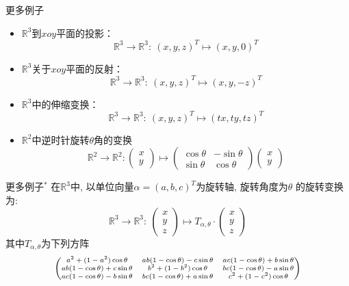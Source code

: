 
\begin{frame}

\begin{block}{更多例子}
\begin{itemize}
\item<1-> $\mathbb{R}^3$到$xoy$平面的投影：
\[\mathbb{R}^3 \to \mathbb{R}^3: \ (x,y,z)^T \mapsto (x,y,0)^T\]
\item<2-> $\mathbb{R}^3$关于$xoy$平面的反射：
\[\mathbb{R}^3 \to \mathbb{R}^3: \ (x,y,z)^T \mapsto (x,y,-z)^T\]
\item<3-> $\mathbb{R}^3$中的伸缩变换：
\[\mathbb{R}^3 \to \mathbb{R}^3: \ (x,y,z)^T \mapsto (tx,ty,tz)^T\]
\item<4-> $\mathbb{R}^2$中逆时针旋转$\theta$角的变换
\[
\mathbb{R}^2 \to \mathbb{R}^2: \begin{pmatrix} x \\ y \end{pmatrix} \mapsto \begin{pmatrix} \cos\theta & -\sin\theta \\ \sin\theta & \cos\theta \end{pmatrix} \begin{pmatrix} x \\ y \end{pmatrix}
\]
\end{itemize}
\end{block}

\end{frame}


\begin{frame}

\begin{block}{更多例子$^*$}
在$\mathbb{R}^3$中, 以单位向量$\alpha = (a,b,c)^T$为旋转轴, 旋转角度为$\theta$ 的旋转变换为:
\[
\mathbb{R}^3 \to \mathbb{R}^3: \ \begin{pmatrix} x \\ y \\ z \end{pmatrix} \mapsto T_{\alpha, \theta} \cdot \begin{pmatrix} x \\ y \\ z \end{pmatrix}
\]
其中$T_{\alpha, \theta}$为下列方阵
\begin{displaymath}
\scriptsize
\begin{pmatrix} a^2+(1-a^2)\cos\theta & ab(1-\cos\theta)-c\sin\theta & ac(1-\cos\theta)+b\sin\theta\\
ab(1-\cos\theta)+c\sin\theta & b^2+(1-b^2)\cos\theta & bc(1-\cos\theta)-a\sin\theta  \\
ac(1-\cos\theta)-b\sin\theta& bc(1-\cos\theta)+a\sin\theta & c^2+(1-c^2)\cos\theta\end{pmatrix}\end{displaymath}
\end{block}

\end{frame}

